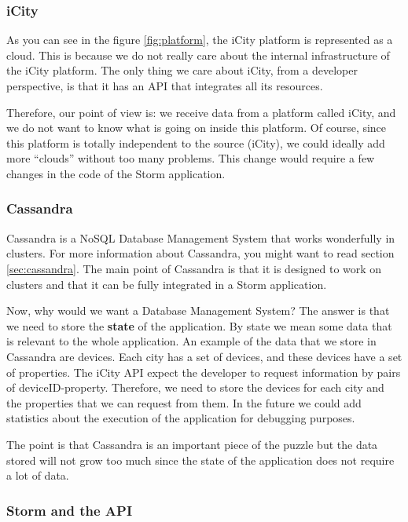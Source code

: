 \subsubsection*{iCity}

As you can see in the figure \ref{fig:platform}, the iCity platform is
represented as a cloud. This is because we do not really care about the internal
infrastructure of the iCity platform. The only thing we care about iCity, from a
developer perspective, is that it has an API that integrates all its resources.

Therefore, our point of view is: we receive data from a platform called iCity,
and we do not want to know what is going on inside this platform. Of course,
since this platform is totally independent to the source (iCity), we could
ideally add more ``clouds'' without too many problems. This change would
require a few changes in the code of the Storm application.

\subsubsection*{Cassandra}

Cassandra is a NoSQL Database Management System that works wonderfully in
clusters. For more information about Cassandra, you might want to read
section \ref{sec:cassandra}. The main point of Cassandra is that it is designed
to work on clusters and that it can be fully integrated in a Storm application.

Now, why would we want a Database Management System? The answer is that we need
to store the {\bf state} of the application. By state we mean some data that is
relevant to the whole application. An example of the data that we store in
Cassandra are devices. Each city has a set of devices, and these devices have a
set of properties. The iCity API expect the developer to request information by
pairs of deviceID-property. Therefore, we need to store the devices for each
city and the properties that we can request from them. In the future we could
add statistics about the execution of the application for debugging purposes.

The point is that Cassandra is an important piece of the puzzle but the data
stored will not grow too much since the state of the application does not
require a lot of data.

\subsubsection*{Storm and the API}

